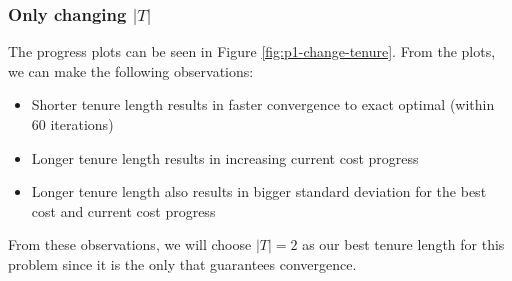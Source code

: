 \subsubsection{Only changing \(|T|\)}

The progress plots can be seen in Figure \ref{fig:p1-change-tenure}. From the plots, we can make the following observations:
\begin{itemize}
    \item Shorter tenure length results in faster convergence to exact optimal (within 60 iterations)
    \item Longer tenure length results in increasing current cost progress
    \item Longer tenure length also results in bigger standard deviation for the best cost and current cost progress
\end{itemize}
From these observations, we will choose \(|T| = 2\) as our best tenure length for this problem since it is the only that guarantees convergence.

